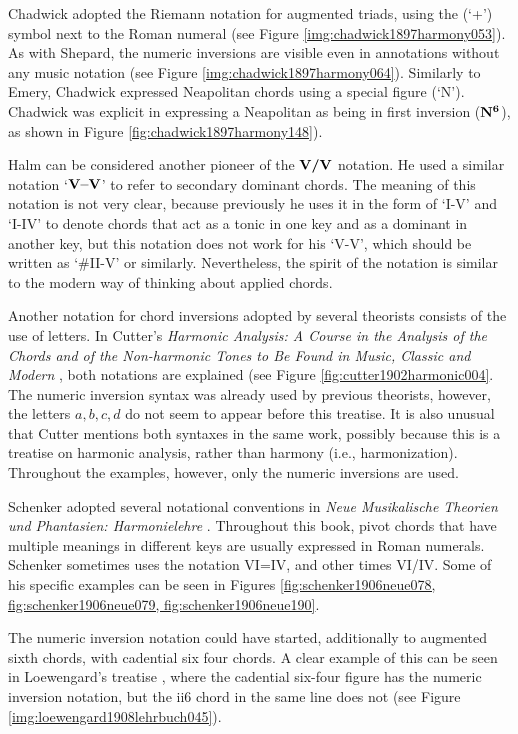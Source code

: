 Chadwick adopted the Riemann notation for augmented triads, using the (`+') symbol next to the Roman numeral (see Figure \ref{img:chadwick1897harmony053}).
As with Shepard, the numeric inversions are visible even in annotations without any music notation (see Figure \ref{img:chadwick1897harmony064}).
Similarly to Emery, Chadwick expressed Neapolitan chords using a special figure (`N').
Chadwick was explicit in expressing a Neapolitan as being in first inversion ($\textbf{N}\relax\relax{\footnotesize {}^\textbf{6}\relax\relax}$), as shown in Figure \ref{fig:chadwick1897harmony148}).

Halm can be considered another pioneer of the $\textbf{V/V}\relax\relax$ notation.
He used a similar notation `$\textbf{V--V}\relax\relax$' to refer to secondary dominant chords.
The meaning of this notation is not very clear, because previously he uses it in the form of `I-V' and `I-IV' to denote chords that act as a tonic in one key and as a dominant in another key, but this notation does not work for his `V-V', which should be written as `#II-V' or similarly.
Nevertheless, the spirit of the notation is similar to the modern way of thinking about applied chords.

Another notation for chord inversions adopted by several theorists consists of the use of letters.
In Cutter's \emph{Harmonic Analysis: A Course in the Analysis of the Chords and of the Non-harmonic Tones to Be Found in Music, Classic and Modern} \textcite{cutter1902harmonic}, both notations are explained (see Figure \ref{fig:cutter1902harmonic004}.
The numeric inversion syntax was already used by previous theorists, however, the letters ${a, b, c , d}$ do not seem to appear before this treatise.
It is also unusual that Cutter mentions both syntaxes in the same work, possibly because this is a treatise on harmonic analysis, rather than harmony (i.e., harmonization).
Throughout the examples, however, only the numeric inversions are used.

Schenker adopted several notational conventions in \emph{Neue Musikalische Theorien und Phantasien: Harmonielehre} \textcite{schenker1906neue}.
Throughout this book, pivot chords that have multiple meanings in different keys are usually expressed in Roman numerals.
Schenker sometimes uses the notation VI=IV, and other times VI/IV.
Some of his specific examples can be seen in Figures \ref{fig:schenker1906neue078, fig:schenker1906neue079, fig:schenker1906neue190}.

The numeric inversion notation could have started, additionally to augmented sixth chords, with cadential six four chords.
A clear example of this can be seen in Loewengard's treatise \textcite{loewengard1908lehrbuch}, where the cadential six-four figure has the numeric inversion notation, but the ii6 chord in the same line does not (see Figure \ref{img:loewengard1908lehrbuch045}).


